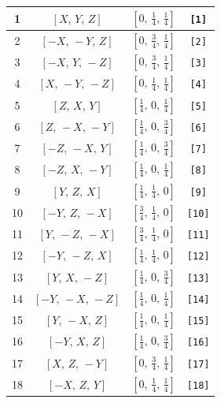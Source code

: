 \documentclass[fleqn,8pt]{jsarticle}
\begin{document}
\begin{longtable}{cccc}
1 & $\left[ X,\, Y,\, Z \right]$ & $\left[ 0,\, \frac{1}{4},\, \frac{1}{4} \right]$ & {\tt [1]} \\ \hline
2 & $\left[ - X,\, - Y,\, Z \right]$ & $\left[ 0,\, \frac{3}{4},\, \frac{1}{4} \right]$ & {\tt [2]} \\ \hline
3 & $\left[ - X,\, Y,\, - Z \right]$ & $\left[ 0,\, \frac{3}{4},\, \frac{1}{4} \right]$ & {\tt [3]} \\ \hline
4 & $\left[ X,\, - Y,\, - Z \right]$ & $\left[ 0,\, \frac{1}{4},\, \frac{1}{4} \right]$ & {\tt [4]} \\ \hline
5 & $\left[ Z,\, X,\, Y \right]$ & $\left[ \frac{1}{4},\, 0,\, \frac{1}{4} \right]$ & {\tt [5]} \\ \hline
6 & $\left[ Z,\, - X,\, - Y \right]$ & $\left[ \frac{1}{4},\, 0,\, \frac{3}{4} \right]$ & {\tt [6]} \\ \hline
7 & $\left[ - Z,\, - X,\, Y \right]$ & $\left[ \frac{1}{4},\, 0,\, \frac{3}{4} \right]$ & {\tt [7]} \\ \hline
8 & $\left[ - Z,\, X,\, - Y \right]$ & $\left[ \frac{1}{4},\, 0,\, \frac{1}{4} \right]$ & {\tt [8]} \\ \hline
9 & $\left[ Y,\, Z,\, X \right]$ & $\left[ \frac{1}{4},\, \frac{1}{4},\, 0 \right]$ & {\tt [9]} \\ \hline
10 & $\left[ - Y,\, Z,\, - X \right]$ & $\left[ \frac{3}{4},\, \frac{1}{4},\, 0 \right]$ & {\tt [10]} \\ \hline
11 & $\left[ Y,\, - Z,\, - X \right]$ & $\left[ \frac{3}{4},\, \frac{1}{4},\, 0 \right]$ & {\tt [11]} \\ \hline
12 & $\left[ - Y,\, - Z,\, X \right]$ & $\left[ \frac{1}{4},\, \frac{1}{4},\, 0 \right]$ & {\tt [12]} \\ \hline
13 & $\left[ Y,\, X,\, - Z \right]$ & $\left[ \frac{1}{4},\, 0,\, \frac{3}{4} \right]$ & {\tt [13]} \\ \hline
14 & $\left[ - Y,\, - X,\, - Z \right]$ & $\left[ \frac{1}{4},\, 0,\, \frac{1}{4} \right]$ & {\tt [14]} \\ \hline
15 & $\left[ Y,\, - X,\, Z \right]$ & $\left[ \frac{1}{4},\, 0,\, \frac{1}{4} \right]$ & {\tt [15]} \\ \hline
16 & $\left[ - Y,\, X,\, Z \right]$ & $\left[ \frac{1}{4},\, 0,\, \frac{3}{4} \right]$ & {\tt [16]} \\ \hline
17 & $\left[ X,\, Z,\, - Y \right]$ & $\left[ 0,\, \frac{3}{4},\, \frac{1}{4} \right]$ & {\tt [17]} \\ \hline
18 & $\left[ - X,\, Z,\, Y \right]$ & $\left[ 0,\, \frac{1}{4},\, \frac{1}{4} \right]$ & {\tt [18]} \\ \hline

\end{longtable}
\end{document}
